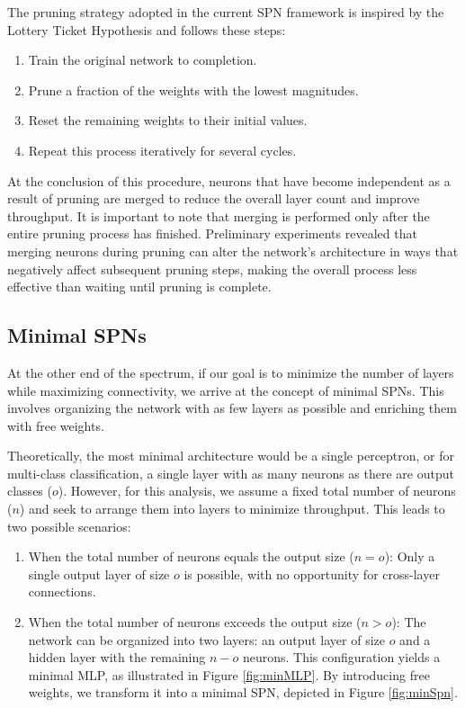 The pruning strategy adopted in the current SPN framework is inspired by the Lottery Ticket Hypothesis and follows these steps:
\begin{enumerate}
    \item Train the original network to completion.
    \item Prune a fraction of the weights with the lowest magnitudes.
    \item Reset the remaining weights to their initial values.
    \item Repeat this process iteratively for several cycles.
\end{enumerate}

At the conclusion of this procedure, neurons that have become independent as a result of pruning are merged to reduce the overall layer count and improve throughput. It is important to note that merging is performed only after the entire pruning process has finished. Preliminary experiments revealed that merging neurons during pruning can alter the network's architecture in ways that negatively affect subsequent pruning steps, making the overall process less effective than waiting until pruning is complete.

\subsection{Minimal SPNs}

At the other end of the spectrum, if our goal is to minimize the number of layers while maximizing connectivity, we arrive at the concept of minimal SPNs. This involves organizing the network with as few layers as possible and enriching them with free weights.

Theoretically, the most minimal architecture would be a single perceptron, or for multi-class classification, a single layer with as many neurons as there are output classes ($o$). However, for this analysis, we assume a fixed total number of neurons ($n$) and seek to arrange them into layers to minimize throughput. This leads to two possible scenarios:

\begin{enumerate}
    \item When the total number of neurons equals the output size ($n = o$): Only a single output layer of size $o$ is possible, with no opportunity for cross-layer connections.
    \item When the total number of neurons exceeds the output size ($n > o$): The network can be organized into two layers: an output layer of size $o$ and a hidden layer with the remaining $n-o$ neurons. This configuration yields a minimal MLP, as illustrated in Figure \ref{fig:minMLP}. By introducing free weights, we transform it into a minimal SPN, depicted in Figure \ref{fig:minSpn}.
\end{enumerate}

